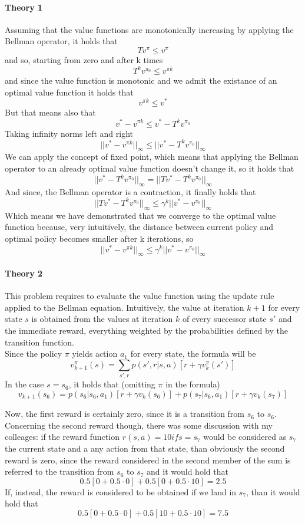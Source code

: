 \documentclass[14pt,a4paper]{extarticle}
\begin{document}
\paragraph{Theory 1}

Assuming that the value functions are monotonically increasing by applying the Bellman operator, it holds that \[Tv^\pi\leq v^\pi\] and so, starting from zero and after k times \[T^kv^{\pi_0}  \leq v^{\pi k}\] and since the value function is monotonic and we admit the existance of an optimal value function it holds that \[v^{\pi k} \leq v^*\] But that means also that \[v^* - v^{\pi k}\leq v^* - T^kv^{\pi_0}\] Taking infinity norms left and right \[||v^* - v^{\pi k}||_\infty \leq ||v^* - T^kv^{\pi_0}||_\infty\] We can apply the concept of fixed point, which means that applying the Bellman operator to an already optimal value function doesn't change it, so it holds that \[||v^* - T^kv^{\pi_0}||_\infty = ||Tv^* - T^kv^{\pi_0}||_\infty\] And since, the Bellman operator is a contraction, it finally holds that \[||Tv^* - T^kv^{\pi_0}||_\infty \leq \gamma^k ||v^* - v^{\pi_0}||_\infty\] Which means we have demonstrated that we converge to the optimal value function because, very intuitively, the distance between current policy and optimal policy becomes smaller after k iterations, so \[||v^* - v^{\pi k}||_\infty \leq \gamma^k ||v^* - v^{\pi_0}||_\infty\] 

\paragraph{Theory 2}

This problem requires to evaluate the value function using the update rule applied to the Bellman equation. Intuitively, the value at iteration $k+1$ for every state $s$ is obtained from the values at iteration $k$ of every successor state $s'$ and the immediate reward, everything weighted by the probabilities defined by the transition function. \\ Since the policy $\pi$ yields action $a_1$ for every state, the formula will be \[v_{k+1}^{\pi}(s) = \sum_{s',r}p(s',r|s,a)[r+\gamma v_{k}^{\pi}(s')]\] In the case $s=s_6$, it holds that (omitting $\pi$ in the formula) \[v_{k+1}(s_6) = p(s_6|s_6,a_1)[r + \gamma v_k(s_6)] + p(s_7|s_6,a_1)[r + \gamma v_k(s_7)]\]

Now, the first reward is certainly zero, since it is a transition from $s_6$ to $s_6$. Concerning the second reward though, there was some discussion with my colleages: if the reward function $r(s,a) = 10 if s = s_7$ would be considered as $s_7$ the current state and a any action from that state, than obviously the second reward is zero, since the reward considered in the second member of the sum is referred to the transition from $s_6$ to $s_7$ and it would hold that \[0.5[0 + 0.5\cdot 0] + 0.5[0 + 0.5 \cdot 10] = 2.5\] If, instead, the reward is considered to be obtained if we land in $s_7$, than it would hold that \[0.5[0 + 0.5\cdot 0] + 0.5[10 + 0.5 \cdot 10] = 7.5\]
 
\end{document}
